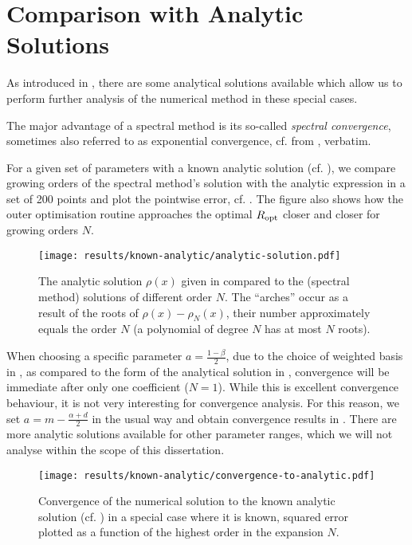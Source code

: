\section{Comparison with Analytic Solutions}
As introduced in , there are some analytical solutions available which allow us to perform further analysis of the numerical method in these special cases.

The major advantage of a spectral method is its so-called \textit{spectral convergence}, sometimes also referred to as exponential convergence, cf.  from \cite{2023-damtp-spectral-methods}, verbatim.


For a given set of parameters with a known analytic solution (cf. ), we compare growing orders of the spectral method's solution with the analytic expression in a set of 200 points and plot the pointwise error, cf. .
The figure also shows how the outer optimisation routine approaches the optimal $R_{\rm opt}$ closer and closer for growing orders $N$.

\begin{figure}[H]
  \centering
  \texttt{[image: results/known-analytic/analytic-solution.pdf]}
  \caption[Comparison with analytical solutions and error]{
    The analytic solution $\rho(x)$ given in  compared to the (spectral method) solutions of different order $N$.
    The ``arches'' occur as a result of the roots of $\rho(x) - \rho_N(x)$, their number approximately equals the order $N$ (a polynomial of degree $N$ has at most $N$ roots).
  }
  \label{fig:analytic-solution}
\end{figure}

When choosing a specific parameter $a = \frac{1-\beta}{2}$, due to the choice of weighted basis in , as compared to the form of the analytical solution in , convergence will be immediate after only one coefficient ($N=1$).
While this is excellent convergence behaviour, it is not very interesting for convergence analysis.
For this reason, we set $a = m - \frac{\alpha+d}{2}$ in the usual way and obtain convergence results in .
There are more analytic solutions available for other parameter ranges, which we will not analyse within the scope of this dissertation.

\begin{figure}[H]
  \centering
  \texttt{[image: results/known-analytic/convergence-to-analytic.pdf]}
  \caption[Convergence to analytic solution]{Convergence of the numerical solution to the known analytic solution (cf. ) in a special case where it is known, squared error plotted as a function of the highest order in the expansion $N$.}
  \label{fig:convergence-to-analytic}
\end{figure}
